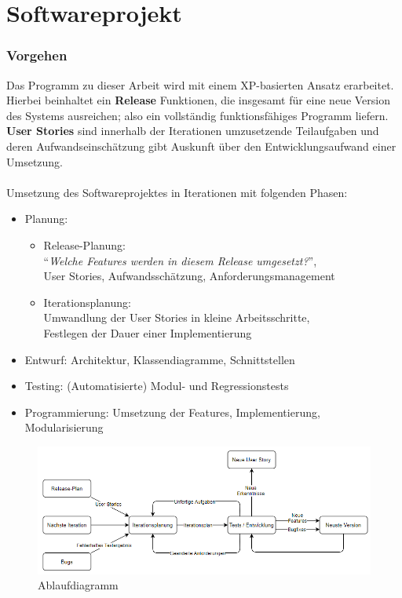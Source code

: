\usepackage{graphicx}%

\chapter{Softwareprojekt}

\subsection{Vorgehen}
Das Programm zu dieser Arbeit wird mit einem XP-basierten Ansatz erarbeitet.
Hierbei beinhaltet ein \textbf{Release} Funktionen, die insgesamt für eine neue Version des Systems ausreichen;
also ein vollständig funktionsfähiges Programm liefern.
\textbf{User Stories} sind innerhalb der Iterationen umzusetzende Teilaufgaben und deren Aufwandseinschätzung gibt
Auskunft über den Entwicklungsaufwand einer Umsetzung.\\~\\
Umsetzung des Softwareprojektes in Iterationen mit folgenden Phasen:
\begin{itemize}
    \item Planung:
    \begin{itemize}
        \item Release-Planung:\\"`\textit{Welche Features werden in diesem Release umgesetzt?}"',\\User Stories,
        Aufwandsschätzung, Anforderungsmanagement
        \item Iterationsplanung:\\Umwandlung der User Stories in kleine Arbeitsschritte,\\Festlegen der Dauer einer
        Implementierung
    \end{itemize}
    \item Entwurf: Architektur, Klassendiagramme, Schnittstellen
    \item Testing: (Automatisierte) Modul- und Regressionstests
    \item Programmierung: Umsetzung der Features, Implementierung, Modularisierung
\end{itemize}
\begin{figure}[H]
    \centering
    \includegraphics[width=15cm]{../../images/extreme_programming.PNG}
    \caption{Ablaufdiagramm}
\end{figure}
